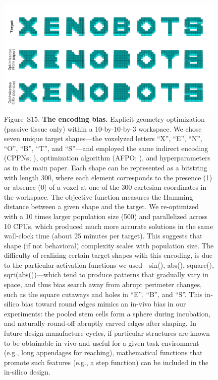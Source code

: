 \begin{figure}[t]
\centering
\includegraphics[width=\linewidth]{Chapter07/img/XENOBOTS.png}
\caption*{Figure~S15.  \textbf{The encoding bias.} 
Explicit geometry optimization (passive tissue only) within a 10-by-10-by-3 workspace. We chose seven unique target shapes---the voxelyzed letters ``X'', ``E'', ``N'', ``O'', ``B'', ``T'', and ``S''---and employed the same indirect encoding (CPPNs; \cite{stanley2007compositional}), optimization algorithm (AFPO; \cite{schmidt2011age}), and hyperparameters as in the main paper. 
Each shape can be represented as a bitstring with length 300, where each element corresponds to the presence (1) or absence (0) of a voxel at one of the 300 cartesian coordinates in the workspace. 
The objective function measures the Hamming distance between a given shape and the target. 
We re-optimized with a 10 times larger population size (500) and parallelized across 10 CPUs, which produced much more accurate solutions in the same wall-clock time (about 25 minutes per target). 
This suggests that shape (if not behavioral) complexity scales with population size.
The difficulty of realizing certain target shapes with this encoding, is due to the particular activation functions we used---sin(), abs(), square(), sqrt(abs())---which tend to produce patterns that gradually vary in space, and thus bias search away from abrupt perimeter changes, such as the square cutaways and holes in ``E'', ``B'', and ``S''. 
This in-silico bias toward round edges mimics an in-vivo bias in our experiments: the pooled stem cells form a sphere during incubation, and naturally round-off abruptly carved edges after shaping.
In future design-manufacture cycles, if particular structures are known to be obtainable in vivo and useful for a given task environment (e.g., long appendages for reaching), mathematical functions that promote such features (e.g., a step function) can be included in the in-silico design.
}
\end{figure}

